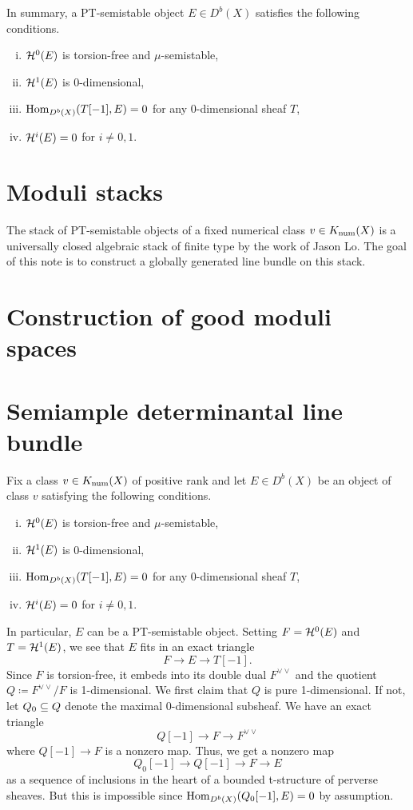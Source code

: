 \documentclass[letterpaper,12pt]{amsart}
\theoremstyle{remark}
\begin{document}
In summary, a PT-semistable object $E \in D^b(X)$ satisfies the following conditions.
\begin{enumerate}[(i)]
    \item $\mathcal{H}^0(E)$ is torsion-free and $\mu$-semistable,
    \item $\mathcal{H}^1(E)$ is 0-dimensional,
    \item $\mathrm{Hom}_{D^b(X)}(T[-1], E) = 0$ for any 0-dimensional sheaf $T$,
    \item $\mathcal{H}^i(E) = 0$ for $i \neq 0, 1$.
\end{enumerate}


\section{Moduli stacks}
The stack of PT-semistable objects of a fixed numerical class $v \in K_{\mathrm{num}}(X)$ is a universally closed algebraic stack of finite type by the work of Jason Lo. The goal of this note is to construct a globally generated line bundle on this stack.

\section{Construction of good moduli spaces}

\section{Semiample determinantal line bundle}
Fix a class $v \in K_{\mathrm{num}}(X)$ of positive rank and let $E \in D^b(X)$ be an object of class $v$ satisfying the following conditions.
\begin{enumerate}[(i)]
    \item $\mathcal{H}^0(E)$ is torsion-free and $\mu$-semistable,
    \item $\mathcal{H}^1(E)$ is 0-dimensional,
    \item $\mathrm{Hom}_{D^b(X)}(T[-1], E) = 0$ for any 0-dimensional sheaf $T$,
    \item $\mathcal{H}^i(E) = 0$ for $i \neq 0, 1$.
\end{enumerate}
In particular, $E$ can be a PT-semistable object. Setting $F = \mathcal{H}^0(E)$ and $T = \mathcal{H}^1(E)$, we see that $E$ fits in an exact triangle
\[ F \to E \to T[-1]. \]
Since $F$ is torsion-free, it embeds into its double dual $F^{\vee\vee}$ and the quotient $Q \coloneqq F^{\vee\vee}/F$ is 1-dimensional. We first claim that $Q$ is pure 1-dimensional. If not, let $Q_0 \subseteq Q$ denote the maximal 0-dimensional subsheaf. We have an exact triangle
\[ Q[-1] \to F \to F^{\vee\vee} \]
where $Q[-1] \to F$ is a nonzero map. Thus, we get a nonzero map
\[ Q_0[-1] \to Q[-1] \to F \to E \]
as a sequence of inclusions in the heart of a bounded t-structure of perverse sheaves. But this is impossible since $\mathrm{Hom}_{D^b(X)}(Q_0[-1], E) = 0$ by assumption.
\end{document}
